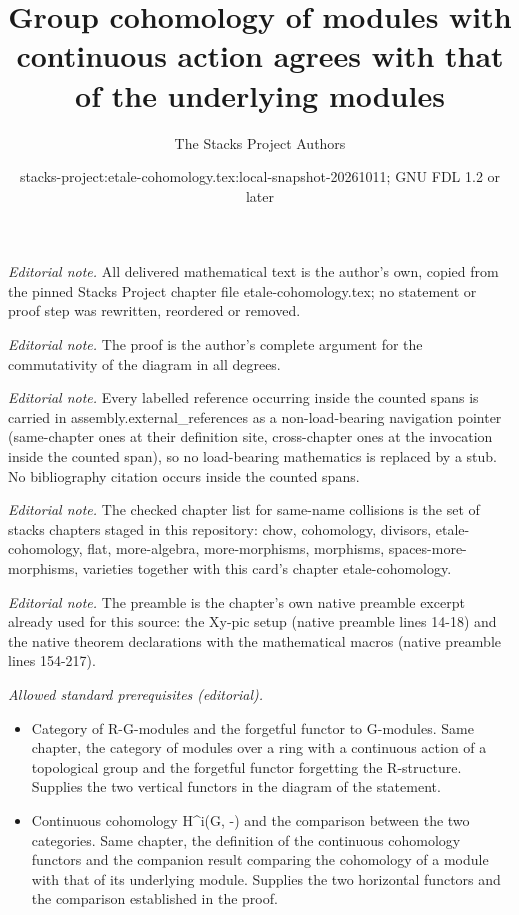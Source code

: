 \documentclass[10pt,a4paper]{amsart}
\title{Group cohomology of modules with continuous action agrees with that of the underlying modules}
\author{The Stacks Project Authors}
\date{stacks-project:etale-cohomology.tex:local-snapshot-20261011; GNU FDL 1.2 or later}
\theoremstyle{plain}
\theoremstyle{definition}
\theoremstyle{remark}
\numberwithin{equation}{subsection}
\begin{document}
\maketitle
\noindent\textit{Editorial note.} All delivered mathematical text is the author's own, copied from the pinned Stacks Project chapter file etale-cohomology.tex; no statement or proof step was rewritten, reordered or removed.\par\medskip
\noindent\textit{Editorial note.} The proof is the author's complete argument for the commutativity of the diagram in all degrees.\par\medskip
\noindent\textit{Editorial note.} Every labelled reference occurring inside the counted spans is carried in assembly.external\_references as a non-load-bearing navigation pointer (same-chapter ones at their definition site, cross-chapter ones at the invocation inside the counted span), so no load-bearing mathematics is replaced by a stub. No bibliography citation occurs inside the counted spans.\par\medskip
\noindent\textit{Editorial note.} The checked chapter list for same-name collisions is the set of stacks chapters staged in this repository: chow, cohomology, divisors, etale-cohomology, flat, more-algebra, more-morphisms, morphisms, spaces-more-morphisms, varieties together with this card's chapter etale-cohomology.\par\medskip
\noindent\textit{Editorial note.} The preamble is the chapter's own native preamble excerpt already used for this source: the Xy-pic setup (native preamble lines 14-18) and the native theorem declarations with the mathematical macros (native preamble lines 154-217).\par\medskip
\noindent\textit{Allowed standard prerequisites (editorial).}\begin{itemize}
\item Category of R-G-modules and the forgetful functor to G-modules. Same chapter, the category of modules over a ring with a continuous action of a topological group and the forgetful functor forgetting the R-structure. Supplies the two vertical functors in the diagram of the statement.
\item Continuous cohomology H\textasciicircum{}i(G, -) and the comparison between the two categories. Same chapter, the definition of the continuous cohomology functors and the companion result comparing the cohomology of a module with that of its underlying module. Supplies the two horizontal functors and the comparison established in the proof.
\end{itemize}\medskip
\end{document}
